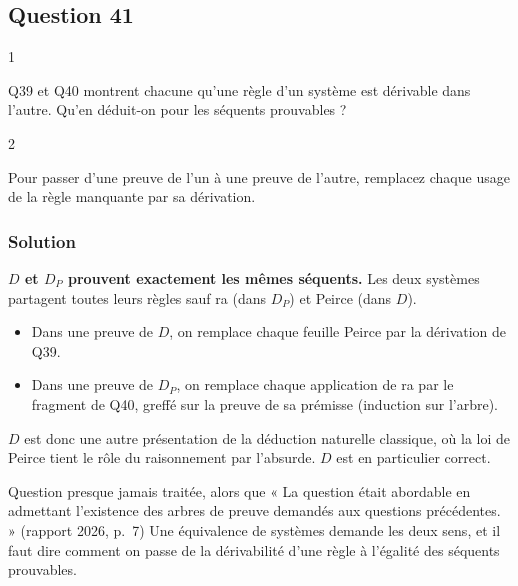 \documentclass[11pt,a4paper]{article}
\providecommand{\tightlist}{\setlength{\itemsep}{0pt}\setlength{\parskip}{0pt}}
\begin{document}
\hypertarget{question-41}{%
\subsection{Question 41}\label{question-41}}

\begin{indication}{1}

Q39 et Q40 montrent chacune qu'une règle d'un système est dérivable dans l'autre. Qu'en déduit-on pour les séquents prouvables ?

\end{indication}

\begin{indication}{2}

Pour passer d'une preuve de l'un à une preuve de l'autre, remplacez chaque usage de la règle manquante par sa dérivation.

\end{indication}

\hypertarget{solution-40}{%
\subsubsection{Solution}\label{solution-40}}

\textbf{\(D\) et \(D_P\) prouvent exactement les mêmes séquents.} Les deux systèmes partagent toutes leurs règles sauf ra (dans \(D_P\)) et Peirce (dans \(D\)).

\begin{itemize}
\tightlist
\item
  Dans une preuve de \(D\), on remplace chaque feuille Peirce par la dérivation de Q39.
\item
  Dans une preuve de \(D_P\), on remplace chaque application de ra par le fragment de Q40, greffé sur la preuve de sa prémisse (induction sur l'arbre).
\end{itemize}

\(D\) est donc une autre présentation de la déduction naturelle classique, où la loi de Peirce tient le rôle du raisonnement par l'absurde. \(D\) est en particulier correct.

\begin{jury}

Question presque jamais traitée, alors que « La question était abordable en admettant l'existence des arbres de preuve demandés aux questions précédentes. » (rapport 2026, p.~7) Une équivalence de systèmes demande les deux sens, et il faut dire comment on passe de la dérivabilité d'une règle à l'égalité des séquents prouvables.

\end{jury}
\end{document}

